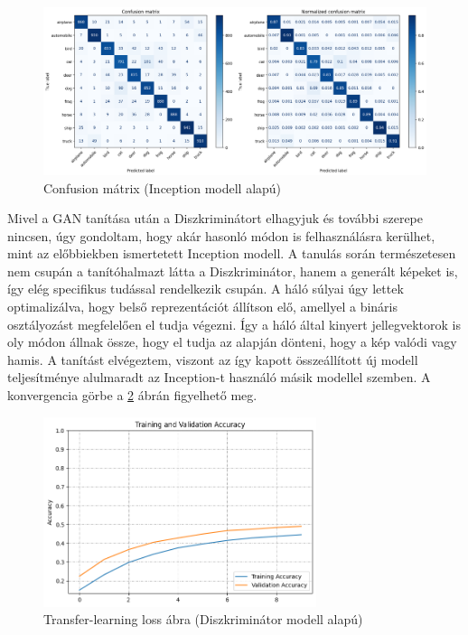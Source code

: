 \begin{figure}[h]
	\centering
	\includegraphics[width=15cm]{images/transfer_confusion.png}
	\caption{Confusion mátrix (Inception modell alapú)}
	\label{fig:transfer_confusion}
\end{figure}

Mivel a GAN tanítása után a Diszkriminátort elhagyjuk és további szerepe nincsen, úgy gondoltam, hogy akár hasonló módon is felhasználásra kerülhet, mint az előbbiekben ismertetett Inception modell. A tanulás során természetesen nem csupán a tanítóhalmazt látta a Diszkriminátor, hanem a generált képeket is, így elég specifikus tudással rendelkezik csupán. A háló súlyai úgy lettek optimalizálva, hogy belső reprezentációt állítson elő, amellyel a bináris osztályozást megfelelően el tudja végezni. Így a háló által kinyert jellegvektorok is oly módon állnak össze, hogy el tudja az alapján dönteni, hogy a kép valódi vagy hamis. A tanítást elvégeztem, viszont az így kapott összeállított új modell teljesítménye alulmaradt az Inception-t használó másik modellel szemben. A konvergencia görbe a \ref{fig:transfer_learning_loss_discriminator} ábrán figyelhető meg.

\begin{figure}[h]
	\centering
	\includegraphics[width=8cm]{images/transfer_discriminator.png}
	\caption{Transfer-learning loss ábra (Diszkriminátor modell alapú)}
	\label{fig:transfer_learning_loss_discriminator}
\end{figure}

